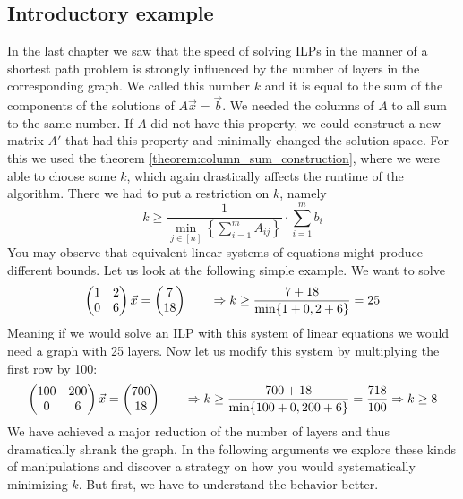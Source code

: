 \subsection{Introductory example}
In the last chapter we saw that the speed of solving ILPs in the manner of a shortest path problem is strongly influenced by the number of layers in the corresponding graph. We called this number $k$ and it is equal to the sum of the components of the solutions of $A\vec x=\vec b$. We needed the columns of $A$ to all sum to the same number. If $A$ did not have this property, we could construct a new matrix $A'$ that had this property and minimally changed the solution space. For this we used the theorem \ref{theorem:column_sum_construction}, where we were able to choose some $k$, which again drastically affects the runtime of the algorithm. There we had to put a restriction on $k$, namely
$$k \geq \frac{1}{\min_{j \in [n]} \left\{ \sum_{i=1}^{m}A_{ij}\right\}}\cdot \sum_{i=1}^{m}b_i$$
You may observe that equivalent linear systems of equations might produce different bounds. Let us look at the following simple example. We want to solve 
$$\left(\begin{matrix}1&2\\0&6\end{matrix}\right)\vec x = \left(\begin{matrix}7\\18\end{matrix}\right) \qquad \Rightarrow k \geq \frac{7 + 18}{\min\{1+0, 2+6\}} = 25$$
Meaning if we would solve an ILP with this system of linear equations we would need a graph with 25 layers. Now let us modify this system by multiplying the first row by 100:
$$\left(\begin{matrix}100&200\\0&6\end{matrix}\right)\vec x = \left(\begin{matrix}700\\18\end{matrix}\right) \qquad \Rightarrow k \geq \frac{700 + 18}{\min\{100+0, 200+6\}} = \frac{718}{100} \Rightarrow k \geq 8$$
We have achieved a major reduction of the number of layers and thus dramatically shrank the graph. In the following arguments we explore these kinds of manipulations and discover a strategy on how you would systematically minimizing $k$. But first, we have to understand the behavior better.

